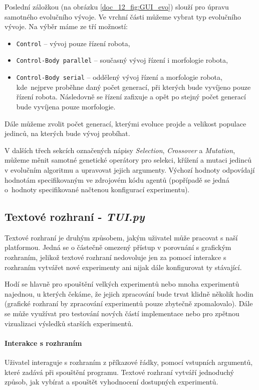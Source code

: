 Poslední záložkou (na obrázku \ref{doc_12_fig:GUI_evo}) slouží pro úpravu
samotného evolučního vývoje. Ve vrchní části můžeme vybrat typ evolučního
vývoje. Na výběr máme ze tří možností: 
\begin{itemize}
    \item \texttt{Control} -- vývoj pouze řízení robota,
    \item \texttt{Control-Body parallel} -- současný vývoj řízení i morfologie
        robota,
    \item \texttt{Control-Body serial} -- oddělený vývoj řízení a morfologie
        robota, kde~nejprve proběhne daný počet generací, při kterých bude
        vyvíjeno pouze řízení robota. Následovně se řízení zafixuje a opět po
        stejný počet generací bude vyvíjena pouze morfologie.
\end{itemize}

Dále můžeme zvolit počet generací, kterými evoluce projde a velikost populace
jedinců, na kterých bude vývoj probíhat.

V dalších třech sekcích označených nápisy \emph{Selection}, \emph{Crossover} a
\emph{Mutation}, můžeme měnit samotné genetické operátory pro selekci, křížení
a mutaci jedinců v evolučním algoritmu a upravovat jejich argumenty. Výchozí
hodnoty odpovídají hodnotám specifikovaným ve zdrojovém kódu agentů (popřípadě
se jedná o~hodnoty specifikované načtenou konfigurací experimentu).

\subsection{Textové rozhraní - \emph{TUI.py}} \label{doc_13_TUI}
Textové rozhraní je druhým způsobem, jakým uživatel může pracovat s naší
platformou. Jedná se o částečně omezený přístup v porovnání s grafickým
rozhraním, jelikož textové rozhraní nedovoluje jen za pomocí interakce s
rozhraním vytvářet nové experimenty ani nijak dále konfigurovat ty stávající.

Hodí se hlavně pro spouštění velkých experimentů nebo mnoha experimentů
najednou, u kterých čekáme, že jejich zpracování bude trvat klidně několik
hodin (grafické rozhraní by zpracování experimentů pouze zbytečně zpomalovalo).
Dále se může využívat pro testování nových částí implementace nebo pro zpětnou
vizualizaci výsledků starších experimentů.

\paragraph{Interakce s rozhraním}
Uživatel interaguje s rozhraním z příkazové řádky, pomocí vstupních argumentů,
které zadává při spouštění programu. Textové rozhraní vytváří jednoduchý
způsob, jak vybírat a spouštět vyhodnocení dostupných experimentů.

